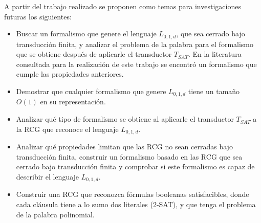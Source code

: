 \begin{conclusionsAndRecomendations}
    A partir del trabajo realizado se proponen como temas para investigaciones futuras los
    siguientes:
    
    \begin{itemize}
        \item Buscar un formalismo que genere el lenguaje $L_{0,1,d}$, que sea cerrado bajo transducción finita, y analizar el problema de la palabra para el formalismo que se obtiene después de aplicarle el transductor $T_{SAT}$. En la literatura
              consultada \cite{globalIndexLanguages} para la realización de este trabajo se encontró un formalismo que cumple las propiedades anteriores.
        \item Demostrar que cualquier formalismo que genere $L_{0,1,d}$ tiene un tamaño $O(1)$ en su representación.
        \item Analizar qué tipo de formalismo se obtiene al aplicarle el transductor $T_{SAT}$ a la RCG que reconoce el lenguaje $L_{0,1,d}$.
        \item Analizar qué propiedades limitan que las RCG no sean cerradas bajo transducción finita, construir un formalismo basado en las RCG que sea cerrado bajo transducción finita y comprobar si este formalismo es capaz de describir el lenguaje $L_{0,1,d}$.
        \item Construir una RCG que reconozca fórmulas booleanas satisfacibles, donde cada cláusula tiene a lo sumo dos literales (2-SAT), y que tenga el problema de la palabra polinomial.
    \end{itemize}
    
\end{conclusionsAndRecomendations}
